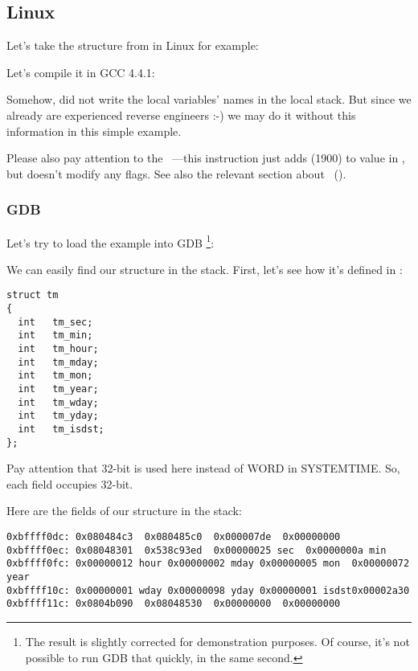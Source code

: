 ﻿\subsection{Linux}

Let's take the  structure from  in Linux for example:



Let's compile it in GCC 4.4.1:



Somehow, \IDA did not write the local variables' names in the local stack.
But since we already are experienced reverse engineers :-) we may do it without this information in 
this simple example.


Please also pay attention to the ~---this instruction just adds  (1900) to value in \EAX,
but doesn't modify any flags. See also the relevant section about \LEA{}~().

\subsubsection{GDB}

Let's try to load the example into GDB
\footnote{The  result is slightly corrected for demonstration purposes.
Of course, it's not possible to run GDB that quickly, in the same second.}:



We can easily find our structure in the stack.
First, let's see how it's defined in :

\begin{lstlisting}[caption=time.h, label=struct_tm]
struct tm
{
  int	tm_sec;
  int	tm_min;
  int	tm_hour;
  int	tm_mday;
  int	tm_mon;
  int	tm_year;
  int	tm_wday;
  int	tm_yday;
  int	tm_isdst;
};
\end{lstlisting}

Pay attention that
32-bit \Tint is used here instead of WORD in SYSTEMTIME.
So, each field occupies 32-bit.

Here are the fields of our structure in the stack:

\begin{lstlisting}
0xbffff0dc:	0x080484c3	0x080485c0	0x000007de	0x00000000
0xbffff0ec:	0x08048301	0x538c93ed	0x00000025 sec	0x0000000a min
0xbffff0fc:	0x00000012 hour	0x00000002 mday	0x00000005 mon 	0x00000072 year
0xbffff10c:	0x00000001 wday	0x00000098 yday	0x00000001 isdst0x00002a30
0xbffff11c:	0x0804b090	0x08048530	0x00000000	0x00000000
\end{lstlisting}

